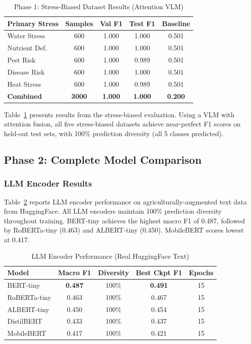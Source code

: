 \documentclass[conference]{IEEEtran}
\begin{document}
\begin{table}[t]
\caption{Phase 1: Stress-Biased Dataset Results (Attention VLM)}
\label{tab:phase1}
\centering\footnotesize
\begin{tabular}{lcccc}
\toprule
\textbf{Primary Stress} & \textbf{Samples} & \textbf{Val F1} &
\textbf{Test F1} & \textbf{Baseline}\\
\midrule
Water Stress     & 600 & 1.000 & 1.000 & 0.501 \\
Nutrient Def.    & 600 & 1.000 & 1.000 & 0.501 \\
Pest Risk        & 600 & 1.000 & 0.989 & 0.501 \\
Disease Risk     & 600 & 1.000 & 1.000 & 0.501 \\
Heat Stress      & 600 & 1.000 & 0.989 & 0.501 \\
\midrule
\textbf{Combined} & \textbf{3000} & \textbf{1.000} & \textbf{1.000} & \textbf{0.200}\\
\bottomrule
\end{tabular}
\end{table}

Table~\ref{tab:phase1} presents results from the stress-biased evaluation. Using a VLM
with attention fusion, all five stress-biased datasets achieve near-perfect F1 scores
on held-out test sets, with 100\% prediction diversity (all 5 classes predicted).
\subsection{Phase 2: Complete Model Comparison}

\subsubsection{LLM Encoder Results}

Table~\ref{tab:llmres} reports LLM encoder performance on agriculturally-augmented text
data from HuggingFace. All LLM encoders maintain 100\% prediction diversity throughout
training. BERT-tiny achieves the highest macro F1 of 0.487, followed by RoBERTa-tiny
(0.463) and ALBERT-tiny (0.450). MobileBERT scores lowest at 0.417.

\begin{table}[t]
\caption{LLM Encoder Performance (Real HuggingFace Text)}
\label{tab:llmres}
\centering\footnotesize
\begin{tabular}{lcccc}
\toprule
\textbf{Model} & \textbf{Macro F1} & \textbf{Diversity} &
\textbf{Best Ckpt F1} & \textbf{Epochs}\\
\midrule
\rowcolor{llmblue!40}
BERT-tiny    & \textbf{0.487} & 100\% & \textbf{0.491} & 15 \\
RoBERTa-tiny & 0.463 & 100\% & 0.467 & 15 \\
ALBERT-tiny  & 0.450 & 100\% & 0.454 & 15 \\
DistilBERT   & 0.433 & 100\% & 0.437 & 15 \\
MobileBERT   & 0.417 & 100\% & 0.421 & 15 \\
\bottomrule
\end{tabular}
\end{table}
\end{document}
